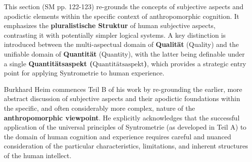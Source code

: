 \documentclass[12pt]{article}
\newcommand{\quantitaetsaspekt}{\text{Quantitätsaspekt}}
\begin{document}
This section (SM pp. 122-123) re-grounds the concepts of subjective aspects and apodictic elements within the specific context of anthropomorphic cognition. It emphasizes the \textbf{pluralistische Struktur} of human subjective aspects, contrasting it with potentially simpler logical systems. A key distinction is introduced between the multi-aspectual domain of \textbf{Qualität} (Quality) and the unifiable domain of \textbf{Quantität} (Quantity), with the latter being definable under a single \textbf{Quantitätsaspekt (\(\quantitaetsaspekt\))}, which provides a strategic entry point for applying Syntrometrie to human experience.

Burkhard Heim commences Teil B of his work by re-grounding the earlier, more abstract discussion of subjective aspects and their apodictic foundations within the specific, and often considerably more complex, nature of the \textbf{anthropomorphic viewpoint}. He explicitly acknowledges that the successful application of the universal principles of Syntrometrie (as developed in Teil A) to the domain of human cognition and experience requires careful and nuanced consideration of the particular characteristics, limitations, and inherent structures of the human intellect.
\end{document}
